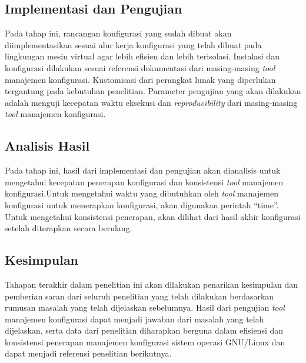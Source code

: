 \documentclass[10pt,twoside]{report}
\begin{document}
\begin{adjustwidth}{20pt}{}
	\subsection{Implementasi dan Pengujian}
	\begin{adjustwidth}{20pt}{}
		Pada tahap ini, rancangan konfigurasi yang sudah dibuat akan
		diimplementasikan sesuai alur kerja konfigurasi yang telah dibuat pada
		lingkungan mesin virtual agar lebih efisien dan lebih terisolasi. Instalasi
		dan konfigurasi dilakukan sesuai referensi dokumentasi dari masing-masing
		\textit{tool} manajemen konfigurasi. Kustomisasi dari perangkat lunak yang
		diperlukan tergantung pada kebutuhan penelitian. Parameter pengujian yang
		akan dilakukan adalah menguji kecepatan waktu eksekusi dan \textit{reproducibility} dari
		masing-masing \textit{tool} manajemen konfigurasi.
	\end{adjustwidth}
\end{adjustwidth}
\begin{adjustwidth}{20pt}{}
	\subsection{Analisis Hasil}

	\begin{adjustwidth}{20pt}{}
		Pada tahap ini, hasil dari implementasi dan pengujian akan dianalisis untuk
		mengetahui kecepatan penerapan konfigurasi dan konsistensi \textit{tool} manajemen
		konfigurasi.Untuk mengetahui waktu yang dibutuhkan oleh \textit{tool} manajemen
		konfigurasi untuk menerapkan konfigurasi, akan digunakan perintah “time”.
		Untuk mengetahui konsistensi penerapan, akan dilihat dari hasil akhir konfigurasi
		setelah diterapkan secara berulang.
	\end{adjustwidth}
\end{adjustwidth}

\begin{adjustwidth}{20pt}{}
	\subsection{Kesimpulan}

	\begin{adjustwidth}{20pt}{}
		Tahapan terakhir dalam penelitian ini akan dilakukan penarikan kesimpulan
		dan pemberian saran dari seluruh penelitian yang telah dilakukan
		berdasarkan rumusan masalah yang telah dijelaskan sebelumnya. Hasil dari
		pengujian \textit{tool} manajemen konfigurasi dapat menjadi jawaban dari masalah
		yang telah dijelaskan, serta data dari penelitian diharapkan berguna dalam
		efisiensi dan konsistensi penerapan manajemen konfigurasi sistem operasi
		GNU/Linux dan dapat menjadi referensi penelitian berikutnya.
	\end{adjustwidth}
\end{adjustwidth}
\vspace{3mm}
\end{document}
